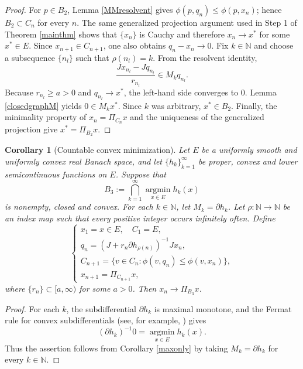 \documentclass[10pt,a4paper]{amsart}
\newtheorem{corollary}[theorem]{Corollary}
\numberwithin{equation}{section}
\begin{document}
\begin{proof}
For $p\in B_2$, Lemma \ref{MMresolvent} gives $\phi(p,q_n)\leq\phi(p,x_n)$; hence $B_2\subset C_n$ for every $n$. The same generalized projection argument used in Step 1 of Theorem \ref{mainthm} shows that $\{x_n\}$ is Cauchy and therefore $x_n\to x^{*}$ for some $x^{*}\in E$. Since $x_{n+1}\in C_{n+1}$, one also obtains $q_n-x_n\to0$. Fix $k\in\mathbb N$ and choose a subsequence $\{n_l\}$ such that $\rho(n_l)=k$. From the resolvent identity,
\[
\frac{Jx_{n_l}-Jq_{n_l}}{r_{n_l}}\in M_kq_{n_l}.
\]
Because $r_{n_l}\geq a>0$ and $q_{n_l}\to x^{*}$, the left-hand side converges to $0$. Lemma \ref{closedgraphM} yields $0\in M_kx^{*}$. Since $k$ was arbitrary, $x^{*}\in B_2$. Finally, the minimality property of $x_n=\Pi_{C_n}x$ and the uniqueness of the generalized projection give $x^{*}=\Pi_{B_2}x$.
\end{proof}

\begin{corollary}[Countable convex minimization]\label{convexmin}
Let $E$ be a uniformly smooth and uniformly convex real Banach space, and let $\{h_k\}_{k=1}^{\infty}$ be proper, convex and lower semicontinuous functions on $E$. Suppose that
\[
B_3:=\bigcap_{k=1}^{\infty}\operatorname*{argmin}_{x\in E} h_k(x)
\]
is nonempty, closed and convex. For each $k\in\mathbb N$, let $M_k=\partial h_k$. Let $\rho:\mathbb N\to\mathbb N$ be an index map such that every positive integer occurs infinitely often. Define
\[
\left\{
\begin{array}{ll}
x_1=x\in E,\quad C_1=E,\\
q_n=(J+r_n\partial h_{\rho(n)})^{-1}Jx_n,\\
C_{n+1}=\{v\in C_n:\phi(v,q_n)\leq\phi(v,x_n)\},\\
x_{n+1}=\Pi_{C_{n+1}}x,
\end{array}
\right.
\]
where $\{r_n\}\subset[a,\infty)$ for some $a>0$. Then $x_n\to\Pi_{B_3}x$.
\end{corollary}

\begin{proof}
For each $k$, the subdifferential $\partial h_k$ is maximal monotone, and the Fermat rule for convex subdifferentials (see, for example, \cite[Section 23]{Rockafellar1970CA}) gives
\[
(\partial h_k)^{-1}0=\operatorname*{argmin}_{x\in E}h_k(x).
\]
Thus the assertion follows from Corollary \ref{maxonly} by taking $M_k=\partial h_k$ for every $k\in\mathbb N$.
\end{proof}
\end{document}
